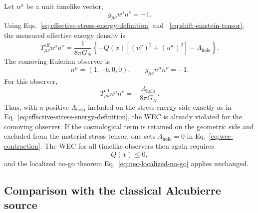 Let \(u^\mu\) be a unit timelike vector,
\begin{equation}
  g_{\mu\nu}u^\mu u^\nu
  =
  -1.
  \label{eq:unit-timelike-condition}
\end{equation}
Using Eqs.~\eqref{eq:effective-stress-energy-definition} and
~\eqref{eq:shift-einstein-tensor}, the measured effective energy density is
\begin{equation}
  T_{\mu\nu}^{\mathrm{eff}}
  u^\mu u^\nu
  =
  \frac{1}{8\pi G_N}
  \left\{
    -Q(x)
    \left[
      (u^y)^2+(u^w)^2
    \right]
    -
    \Lambda_{\mathrm{holo}}
  \right\}.
  \label{eq:wec-contraction}
\end{equation}
The comoving Eulerian observer is
\begin{equation}
  n^\mu
  =
  (1,-b,0,0),
  \qquad
  g_{\mu\nu}n^\mu n^\nu
  =
  -1.
  \label{eq:eulerian-observer-section5}
\end{equation}
For this observer,
\begin{equation}
  T_{\mu\nu}^{\mathrm{eff}}
  n^\mu n^\nu
  =
  -\frac{\Lambda_{\mathrm{holo}}}
  {8\pi G_N}.
  \label{eq:eulerian-wec-density}
\end{equation}
Thus, with a positive \(\Lambda_{\mathrm{holo}}\) included on the
stress-energy side exactly as in
Eq.~\eqref{eq:effective-stress-energy-definition}, the WEC is already violated
for the comoving observer.  If the cosmological term is retained on the
geometric side and excluded from the material stress tensor, one sets
\(\Lambda_{\mathrm{holo}}=0\) in
Eq.~\eqref{eq:wec-contraction}.  The WEC for all timelike observers then again
requires
\begin{equation}
  Q(x)\leq0,
  \label{eq:wec-condition-zero-lambda}
\end{equation}
and the localized no-go theorem
Eq.~\eqref{eq:nec-localized-no-go} applies unchanged.

\subsection{Comparison with the classical Alcubierre source}

